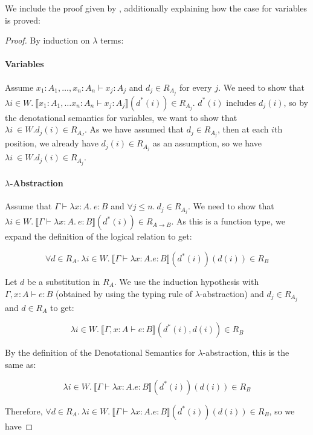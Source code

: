 We include the proof given by \citep{Streicher06}, additionally explaining how the case for variables is proved:

\begin{proof}
By induction on $\lambda$ terms:

\paragraph{Variables} Assume $x_1 : A_1, \dots , x_n : A_n \vdash x_j : A_j$ and $d_j \in R_{A_j}$ for every $j$. We need to show that $\lambda i \in W. \ \llbracket x_1 : A_1, \dots x_n : A_n \vdash x_j : A_j \rrbracket(d^*(i)) \in R_{A_j} $. $d^*(i)$ includes $d_j(i)$, so by the denotational semantics for variables, we want to show that $\lambda i \ \in W. d_j(i) \in R_{A_J}$. As we have assumed that $d_j \in R_{A_j}$, then at each $i$th position, we already have $d_j(i) \in R_{A_j}$ as an assumption, so we have  $\lambda i \ \in W. d_j(i) \in R_{A_j}$.
 
\paragraph{$\lambda$-Abstraction} Assume that $\Gamma \vdash \lambda x : A. \ e : B $ and $\forall j \leq n. \ d_j \in R_{A_j}$. We need to show that $\lambda i \in W. \  \llbracket \Gamma \vdash \lambda x : A. \ e : B \rrbracket (d^*(i)) \in R_{A \to B}$. As this is a function type, we expand the definition of the logical relation to get:

\[ \forall d \in R_A. \ \lambda i \in W. \ \llbracket \Gamma \vdash \lambda x:A. e : B \rrbracket (d^*(i))(d(i)) \in R_B\]

Let $d$ be a substitution in $R_A$. We use the induction hypothesis with $\Gamma, x : A \vdash e : B$ (obtained by using the typing rule of $\lambda$-abstraction) and $d_j \in R_{A_j}$  and $d \in R_A$ to get:

\[\lambda i \in W. \ \llbracket \Gamma ,x:A \vdash e : B \rrbracket (d^*(i),d(i))\in R_B \]

By the definition of the Denotational Semantics for $\lambda$-abstraction, this is the same as:

\[\lambda i \in W. \ \llbracket \Gamma \vdash \lambda x:A. e : B \rrbracket (d^*(i))(d(i)) \in R_B\]

Therefore, $\forall d \in R_A. \ \lambda i \in W. \ \llbracket \Gamma \vdash \lambda x:A. e : B \rrbracket (d^*(i))(d(i)) \in R_B$, so we have 


\end{proof}
